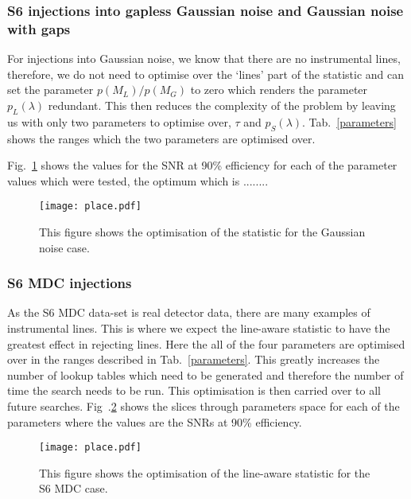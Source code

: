 \subsubsection{S6 injections into gapless Gaussian noise and Gaussian noise with gaps}

For injections into Gaussian noise, we know that there are no instrumental lines, therefore, we do not need to optimise over the `lines' part of the statistic and can set the parameter $p(M_L)/p(M_G)$ to zero which renders the parameter $p_L(\lambda)$ redundant. 
This then reduces the complexity of the problem by leaving us with only two parameters to optimise over, $\tau$ and $p_S(\lambda)$. 
Tab.~\ref{parameters} shows the ranges which the two parameters are optimised over. 

Fig.~\ref{viterbi:optimisation:gauss} shows the values for the \ac{SNR} at 90\% efficiency for each of the parameter values which were tested, the optimum which is ........  

\begin{figure}
    \centering
    \texttt{[image: place.pdf]}
    \caption{This figure shows the optimisation of the statistic for the Gaussian noise case.}
    \label{viterbi:optimisation:gauss}
\end{figure}


\subsubsection{S6 MDC injections}

As the S6 \ac{MDC} data-set is real detector data, there are many examples of instrumental lines. 
This is where we expect the line-aware statistic to have the greatest effect in rejecting lines. 
Here the all of the four parameters are optimised over in the ranges described in Tab.~\ref{parameters}. 
This greatly increases the number of lookup tables which need to be generated and therefore the number of time the search needs to be run. This optimisation is then carried over to all future searches.
Fig~.\ref{viterbi:optimisation:s6mdc} shows the slices through parameters space for each of the parameters where the values are the \acp{SNR} at 90\% efficiency.  

\begin{figure}
    \centering
    \texttt{[image: place.pdf]}
    \caption{This figure shows the optimisation of the line-aware statistic for the S6 \ac{MDC} case.}
    \label{viterbi:optimisation:s6mdc}
\end{figure}

